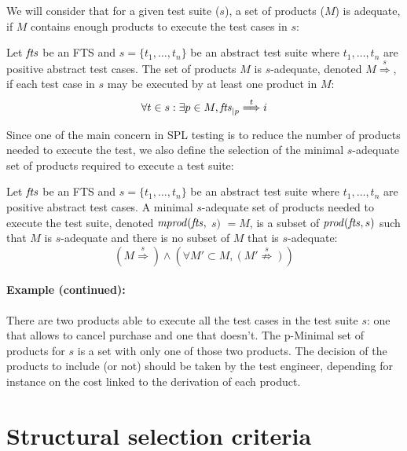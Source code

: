 We will consider that for a given test suite ($s$), a set of products ($M$) is adequate, if $M$ contains enough products to execute the test cases in $s$:
\begin{definition}
Let $\mathit{fts}$ be an FTS and $s = \{t_1 , \ldots , t_n \}$ be an abstract test suite where $t_1, \ldots, t_n$ are positive abstract test cases. The set of products $M$ is $s$-adequate, denoted $M\overset{s}{\Longrightarrow}$, if each test case in $s$ may be executed by at least one product in $M$:
$$\forall t \in s: \exists p \in M, \mathit{fts}_{\mid p} \overset{t}{\Longrightarrow} i $$
\end{definition}

Since one of the main concern in SPL testing is to reduce the number of products needed to execute the test, we also define the selection of the minimal $s$-adequate set of products required to execute a test suite:
%
\begin{definition}
Let $\mathit{fts}$ be an FTS  and $s = \{t_1 , \ldots , t_n \}$ be an abstract test suite where $t_1, \ldots, t_n$ are positive abstract test cases. A minimal $s$-adequate set of products needed to execute the test suite, denoted $\mathit{mprod}(\mathit{fts},$ $s)$ $= M$, is a subset of $\mathit{prod}(\mathit{fts}, s)$ such that $M$ is $s$-adequate and there is no subset of $M$ that is $s$-adequate: 
$$ \left( M\overset{s}{\Longrightarrow} \right) \wedge \left( \forall M' \subset M, \left( M'\overset{s}{\not\Longrightarrow} \right) \right) $$
\end{definition}

\paragraph{Example (continued):} 

There are two products able to execute all the test cases in the test suite $s$: one that allows to cancel purchase and one that doesn't. The p-Minimal set of products for $s$ is a set with only one of those two products. The decision of the products to include (or not) should be taken by the test engineer, depending for instance on the cost linked to the derivation of each product.


\section{Structural selection criteria}

